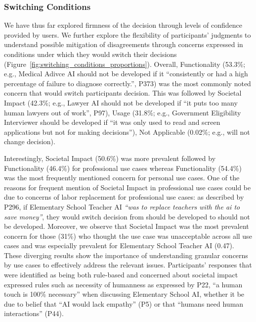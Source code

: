 \subsubsection{Switching Conditions}

We have thus far explored firmness of the decision through levels of confidence provided by users. We further explore the flexibility of participants' judgments to understand possible mitigation of disagreements through concerns expressed in conditions under which they would switch their decisions (Figure~\ref{fig:switching_conditions_proportions}). Overall, Functionality (53.3\%; e.g., Medical Adivce AI should not be developed if it ``consistently or had a high percentage of failure to diagnose correctly.'', P373) was the most commonly noted concern that would switch participants decision. This was followed by Societal Impact (42.3\%; e.g., Lawyer AI should not be developed if ``it puts too many human lawyers out of work'', P97), Usage (31.8\%; e.g., Government Eligibility Interviewer should be developed if ``it was only used to read and screen applications but not for making decisions''), Not Applicable (0.02\%; e.g., will not change decision). 

Interestingly, Societal Impact (50.6\%) was more prevalent followed by Functionality (46.4\%) for professional use cases whereas Functionality (54.4\%) was the most frequently mentioned concern for personal use cases. One of the reasons for frequent mention of Societal Impact in professional use cases could be due to concerns of labor replacement for professional use cases: as described by P296, if Elementary School Teacher AI \textit{``was to replace teachers with the ai to save money''}, they would switch decision from should be developed to should not be developed. Moreover, we observe that Societal Impact was the most prevalent concern for those (31\%) who thought the use case was unacceptable across all use cases and was especially prevalent for Elementary School Teacher AI (0.47). These diverging results show the importance of understanding granular concerns by use cases to effectively address the relevant issues. Participants' responses that were identified as being both rule-based and concerned about societal impact expressed rules such as necessity of humanness as expressed by P22, ``a human touch is 100\% necessary'' when discussing Elementary School AI, whether it be due to belief that ``AI would lack empathy'' (P5) or that ``humans need human interactions'' (P44).

